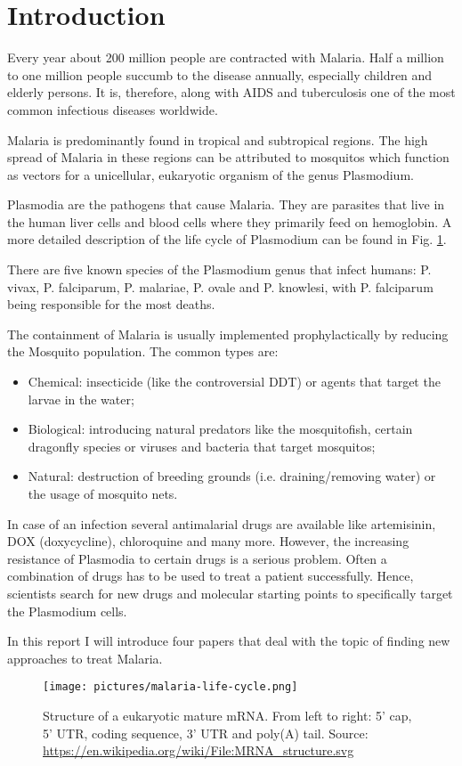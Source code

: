 \section{Introduction}
Every year about 200 million people are contracted with Malaria. Half a million to one million people succumb to the disease annually, especially children and elderly persons. It is, therefore, along with AIDS and tuberculosis one of the most common infectious diseases worldwide. 

Malaria is predominantly found in tropical and subtropical regions. The high spread of Malaria in these regions can be attributed to mosquitos which function as vectors for a unicellular, eukaryotic organism of the genus Plasmodium. 

Plasmodia are the pathogens that cause Malaria. They are parasites that live in the human liver cells and blood cells where they primarily feed on hemoglobin. A more detailed description of the life cycle of Plasmodium can be found in Fig. \ref{plasmodium_life_cycle}.

There are five known species of the Plasmodium genus that infect humans: P. vivax, P. falciparum, P. malariae, P. ovale and P. knowlesi, with P. falciparum being responsible for the most deaths. 

The containment of Malaria is usually implemented prophylactically by reducing the Mosquito population. 
The common types are:
\begin{itemize}
\item Chemical: insecticide (like the controversial DDT) or agents that target the larvae in the water;
\item Biological: introducing natural predators like the mosquitofish, certain dragonfly species or viruses and bacteria that target mosquitos;
\item Natural: destruction of breeding grounds (i.e. draining/removing water) or the usage of mosquito nets.
\end{itemize} 
In case of an infection several antimalarial drugs are available like artemisinin, DOX (doxycycline), chloroquine and many more. However, the increasing resistance of Plasmodia to certain drugs is a serious problem. Often a combination of drugs has to be used to treat a patient successfully. Hence, scientists search for new drugs and molecular starting points to specifically target the Plasmodium cells. 

In this report I will introduce four papers that deal with the topic of finding new approaches to treat Malaria. 

\begin{figure}[ht!]
	\centering
	\centerline{\texttt{[image: pictures/malaria-life-cycle.png]}}
	\caption[Life cycle of Plasmodia]{Structure of a eukaryotic mature mRNA. From left to right: 5' cap, 5' UTR, coding sequence, 3' UTR and poly(A) tail. Source: \url{https://en.wikipedia.org/wiki/File:MRNA_structure.svg}}
	\label{plasmodium_life_cycle}
\end{figure}

